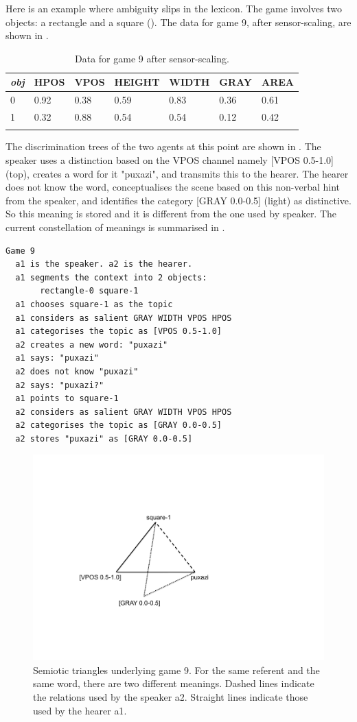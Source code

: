 Here is an example where ambiguity slips in 
the lexicon. The game involves two 
objects: a rectangle and a square (). 
The data for game 9, after sensor-scaling, are
shown in .  
\begin{table}
\begin{center}
\begin{tabular}{ l  l  l  l  l  l  l }
\lsptoprule
{\itshape obj} & HPOS & VPOS & HEIGHT & WIDTH & GRAY & AREA \\ \midrule
0 & 0.92 & 0.38 & 0.59 & 0.83 & 0.36 & 0.61\\ 
1 & 0.32 & 0.88 & 0.54 & 0.54 & 0.12 & 0.42\\ 
\lspbottomrule
\end{tabular}
\caption{\label{tab:different} Data for game 9 after sensor-scaling.}
\end{center}
\end{table}
The discrimination trees of the two agents at this point
are shown in . 
The speaker uses a distinction based on the 
VPOS channel namely [VPOS 0.5-1.0] (top), creates
a word for it "puxazi", and transmits this to the hearer. 
The hearer does not know the word,
conceptualises the scene based on this non-verbal
hint from the speaker, and identifies the category
{}[GRAY 0.0-0.5] (light) as distinctive. So this 
meaning is stored and it is different from the one used by 
speaker. The current constellation of meanings
is summarised in . 
\begin{verbatim}
Game 9
  a1 is the speaker. a2 is the hearer. 
  a1 segments the context into 2 objects: 
       rectangle-0 square-1 
  a1 chooses square-1 as the topic 
  a1 considers as salient GRAY WIDTH VPOS HPOS 
  a1 categorises the topic as [VPOS 0.5-1.0]
  a2 creates a new word: "puxazi"
  a1 says: "puxazi"
  a2 does not know "puxazi"
  a2 says: "puxazi?"
  a1 points to square-1
  a2 considers as salient GRAY WIDTH VPOS HPOS 
  a2 categorises the topic as [GRAY 0.0-0.5]
  a2 stores "puxazi" as [GRAY 0.0-0.5]
\end{verbatim}
\begin{figure}[htbp]
  \centerline{\includegraphics[width=.45\textwidth]{chap6/figs/triangle4}}
\caption{\label{triangle4} Semiotic triangles
underlying game 9. For the same referent and the same word, 
there are two different meanings. Dashed lines indicate
the relations used by the speaker {\bfshape  a2}. Straight lines
indicate those used by the hearer {\bfshape  a1}.}
\end{figure}

